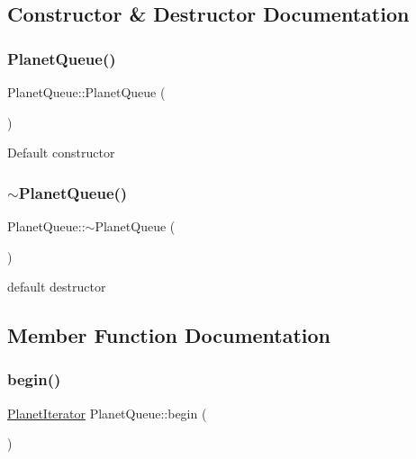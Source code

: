 \subsection{Constructor \& Destructor Documentation}
\mbox{\label{classPlanetQueue_aece3bd14bfbffdd61c5413bac9d92abf}} 
\subsubsection{\texorpdfstring{Planet\+Queue()}{PlanetQueue()}}
{\footnotesize\ttfamily Planet\+Queue\+::\+Planet\+Queue (\begin{DoxyParamCaption}{ }\end{DoxyParamCaption})}

Default constructor \mbox{\label{classPlanetQueue_a401c7ec48201e2a9941ca9c952491f52}} 
\subsubsection{\texorpdfstring{$\sim$\+Planet\+Queue()}{~PlanetQueue()}}
{\footnotesize\ttfamily Planet\+Queue\+::$\sim$\+Planet\+Queue (\begin{DoxyParamCaption}{ }\end{DoxyParamCaption})}

default destructor 

\subsection{Member Function Documentation}
\mbox{\label{classPlanetQueue_a00290482aee16d320ce429a03437751c}} 
\subsubsection{\texorpdfstring{begin()}{begin()}}
{\footnotesize\ttfamily \hyperlink{classPlanetIterator}{Planet\+Iterator} Planet\+Queue\+::begin (\begin{DoxyParamCaption}{ }\end{DoxyParamCaption})}


